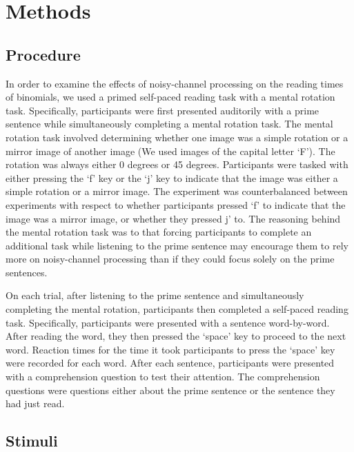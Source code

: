 \documentclass[
  12pt,
]{scrartcl}
\begin{document}
\section{Methods}\label{methods}

\subsection{Procedure}\label{procedure}

In order to examine the effects of noisy-channel processing on the
reading times of binomials, we used a primed self-paced reading task
with a mental rotation task. Specifically, participants were first
presented auditorily with a prime sentence while simultaneously
completing a mental rotation task. The mental rotation task involved
determining whether one image was a simple rotation or a mirror image of
another image (We used images of the capital letter `F'). The rotation
was always either 0 degrees or 45 degrees. Participants were tasked with
either pressing the `f' key or the `j' key to indicate that the image
was either a simple rotation or a mirror image. The experiment was
counterbalanced between experiments with respect to whether participants
pressed `f' to indicate that the image was a mirror image, or whether
they pressed j' to. The reasoning behind the mental rotation task was to
that forcing participants to complete an additional task while listening
to the prime sentence may encourage them to rely more on noisy-channel
processing than if they could focus solely on the prime sentences.

On each trial, after listening to the prime sentence and simultaneously
completing the mental rotation, participants then completed a self-paced
reading task. Specifically, participants were presented with a sentence
word-by-word. After reading the word, they then pressed the `space' key
to proceed to the next word. Reaction times for the time it took
participants to press the `space' key were recorded for each word. After
each sentence, participants were presented with a comprehension question
to test their attention. The comprehension questions were questions
either about the prime sentence or the sentence they had just read.

\subsection{Stimuli}\label{stimuli}
\end{document}
